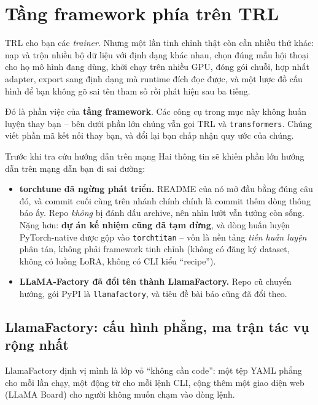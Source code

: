 
\section{Tầng framework phía trên TRL}
\label{sec:ft_frameworks}

TRL cho bạn các \emph{trainer}. Nhưng một lần tinh chỉnh thật còn cần nhiều thứ khác: nạp và trộn nhiều bộ dữ liệu với định dạng khác nhau, chọn đúng mẫu hội thoại cho họ mô hình đang dùng, khởi chạy trên nhiều GPU, đóng gói chuỗi, hợp nhất adapter, export sang định dạng mà runtime đích đọc được, và một lược đồ cấu hình để bạn không gõ sai tên tham số rồi phát hiện sau ba tiếng.

Đó là phần việc của \textbf{tầng framework}. Các công cụ trong mục này không huấn luyện thay bạn -- bên dưới phần lớn chúng vẫn gọi TRL và \texttt{transformers}. Chúng viết phần mã kết nối thay bạn, và đổi lại bạn chấp nhận quy ước của chúng.

\begin{pitfall}{Trước khi tra cứu hướng dẫn trên mạng}
Hai thông tin sẽ khiến phần lớn hướng dẫn trên mạng dẫn bạn đi sai đường:
\begin{itemize}
	\item \textbf{torchtune đã ngừng phát triển.} README của nó mở đầu bằng đúng câu đó, và commit cuối cùng trên nhánh chính chính là commit thêm dòng thông báo ấy. Repo \emph{không} bị đánh dấu archive, nên nhìn lướt vẫn tưởng còn sống. Nặng hơn: \textbf{dự án kế nhiệm cũng đã tạm dừng}, và dòng huấn luyện PyTorch-native được gộp vào \texttt{torchtitan} -- vốn là nền tảng \emph{tiền huấn luyện} phân tán, không phải framework tinh chỉnh (không có đăng ký dataset, không có luồng LoRA, không có CLI kiểu “recipe”).
	\item \textbf{LLaMA-Factory đã đổi tên thành LlamaFactory.} Repo cũ chuyển hướng, gói PyPI là \texttt{llamafactory}, và tiêu đề bài báo cũng đã đổi theo.
\end{itemize}
\end{pitfall}

\subsection{LlamaFactory: cấu hình phẳng, ma trận tác vụ rộng nhất}
\label{ssec:llamafactory}

LlamaFactory \cite{zheng2024llamafactory} định vị mình là lớp vỏ “không cần code”: một tệp YAML phẳng cho mỗi lần chạy, một động từ cho mỗi lệnh CLI, cộng thêm một giao diện web (LLaMA Board) cho người không muốn chạm vào dòng lệnh.

